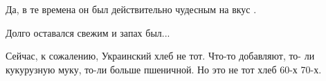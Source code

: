  
 
 
 
 


Да, в те времена он был действительно чудесным на вкус .

Долго оставался свежим и запах был...

Сейчас, к сожалению, Украинский хлеб не тот. Что-то добавляют, то- ли
кукурузную муку, то-ли больше пшеничной. Но это не тот хлеб 60-х 70-х.
